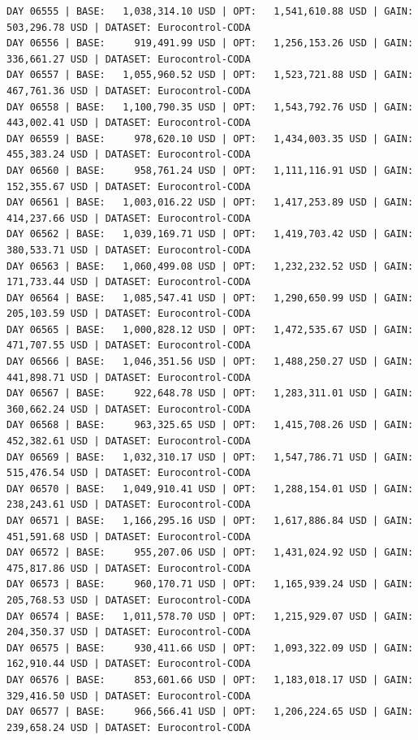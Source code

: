 \documentclass[11pt,a4paper]{article}
\begin{document}
\begin{verbatim}
DAY 06555 | BASE:   1,038,314.10 USD | OPT:   1,541,610.88 USD | GAIN: 503,296.78 USD | DATASET: Eurocontrol-CODA
DAY 06556 | BASE:     919,491.99 USD | OPT:   1,256,153.26 USD | GAIN: 336,661.27 USD | DATASET: Eurocontrol-CODA
DAY 06557 | BASE:   1,055,960.52 USD | OPT:   1,523,721.88 USD | GAIN: 467,761.36 USD | DATASET: Eurocontrol-CODA
DAY 06558 | BASE:   1,100,790.35 USD | OPT:   1,543,792.76 USD | GAIN: 443,002.41 USD | DATASET: Eurocontrol-CODA
DAY 06559 | BASE:     978,620.10 USD | OPT:   1,434,003.35 USD | GAIN: 455,383.24 USD | DATASET: Eurocontrol-CODA
DAY 06560 | BASE:     958,761.24 USD | OPT:   1,111,116.91 USD | GAIN: 152,355.67 USD | DATASET: Eurocontrol-CODA
DAY 06561 | BASE:   1,003,016.22 USD | OPT:   1,417,253.89 USD | GAIN: 414,237.66 USD | DATASET: Eurocontrol-CODA
DAY 06562 | BASE:   1,039,169.71 USD | OPT:   1,419,703.42 USD | GAIN: 380,533.71 USD | DATASET: Eurocontrol-CODA
DAY 06563 | BASE:   1,060,499.08 USD | OPT:   1,232,232.52 USD | GAIN: 171,733.44 USD | DATASET: Eurocontrol-CODA
DAY 06564 | BASE:   1,085,547.41 USD | OPT:   1,290,650.99 USD | GAIN: 205,103.59 USD | DATASET: Eurocontrol-CODA
DAY 06565 | BASE:   1,000,828.12 USD | OPT:   1,472,535.67 USD | GAIN: 471,707.55 USD | DATASET: Eurocontrol-CODA
DAY 06566 | BASE:   1,046,351.56 USD | OPT:   1,488,250.27 USD | GAIN: 441,898.71 USD | DATASET: Eurocontrol-CODA
DAY 06567 | BASE:     922,648.78 USD | OPT:   1,283,311.01 USD | GAIN: 360,662.24 USD | DATASET: Eurocontrol-CODA
DAY 06568 | BASE:     963,325.65 USD | OPT:   1,415,708.26 USD | GAIN: 452,382.61 USD | DATASET: Eurocontrol-CODA
DAY 06569 | BASE:   1,032,310.17 USD | OPT:   1,547,786.71 USD | GAIN: 515,476.54 USD | DATASET: Eurocontrol-CODA
DAY 06570 | BASE:   1,049,910.41 USD | OPT:   1,288,154.01 USD | GAIN: 238,243.61 USD | DATASET: Eurocontrol-CODA
DAY 06571 | BASE:   1,166,295.16 USD | OPT:   1,617,886.84 USD | GAIN: 451,591.68 USD | DATASET: Eurocontrol-CODA
DAY 06572 | BASE:     955,207.06 USD | OPT:   1,431,024.92 USD | GAIN: 475,817.86 USD | DATASET: Eurocontrol-CODA
DAY 06573 | BASE:     960,170.71 USD | OPT:   1,165,939.24 USD | GAIN: 205,768.53 USD | DATASET: Eurocontrol-CODA
DAY 06574 | BASE:   1,011,578.70 USD | OPT:   1,215,929.07 USD | GAIN: 204,350.37 USD | DATASET: Eurocontrol-CODA
DAY 06575 | BASE:     930,411.66 USD | OPT:   1,093,322.09 USD | GAIN: 162,910.44 USD | DATASET: Eurocontrol-CODA
DAY 06576 | BASE:     853,601.66 USD | OPT:   1,183,018.17 USD | GAIN: 329,416.50 USD | DATASET: Eurocontrol-CODA
DAY 06577 | BASE:     966,566.41 USD | OPT:   1,206,224.65 USD | GAIN: 239,658.24 USD | DATASET: Eurocontrol-CODA

\end{verbatim}
\end{document}
